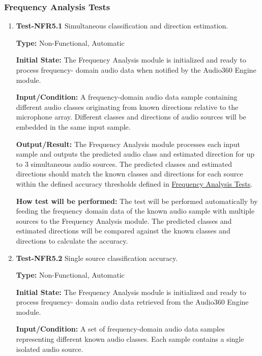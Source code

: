 \documentclass[12pt, titlepage]{article}
\begin{document}
\subsubsection{Frequency Analysis Tests}

\begin{enumerate}

\item{\textbf{Test-NFR5.1} Simultaneous classification and direction estimation.\\}

\textbf{Type:} Non-Functional, Automatic

\textbf{Initial State:}
The Frequency Analysis module is initialized and ready to process frequency-
domain audio data when notified by the Audio360 Engine module.

\textbf{Input/Condition:}
A frequency-domain audio data sample containing different audio
classes originating from known directions relative to the microphone array.
Different classes and directions of audio sources will be embedded in the same
input sample.

\textbf{Output/Result:}
The Frequency Analysis module processes each input sample and outputs
the predicted audio class and estimated direction for up to 3 simultaneous audio
sources. The predicted classes and estimated directions should match the known
classes and directions for each source within the defined accuracy thresholds
defined in \hyperref[sec:freq-analysis-tests]{Frequency Analysis Tests}.

\textbf{How test will be performed:}
The test will be performed automatically by feeding the frequency
domain data of the known audio sample with multiple sources to the Frequency
Analysis module. The predicted classes and estimated directions will be
compared against the known classes and directions to calculate the accuracy.

\item{\textbf{Test-NFR5.2} Single source classification accuracy.\\}
 
\textbf{Type:} Non-Functional, Automatic

\textbf{Initial State:}
The Frequency Analysis module is initialized and ready to process frequency-
domain audio data retrieved from the Audio360 Engine module.

\textbf{Input/Condition:}
A set of frequency-domain audio data samples representing different known audio
classes. Each sample contains a single isolated audio source.


\end{enumerate}
\end{document}
